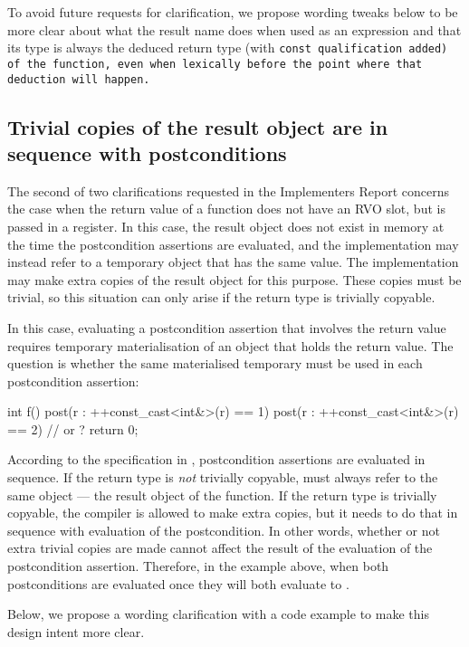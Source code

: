 To avoid future requests for clarification, we propose wording tweaks below to be more clear about what the result name does when used as an expression and that its type is always the deduced return type (with \tt{const} qualification added) of the function, even when lexically before the point where that deduction will happen.

\subsection{Trivial copies of the result object are in sequence with postconditions}

The second of two clarifications requested in the Implementers Report \cite{P3460R0} concerns the case when the return value of a function does not have an RVO slot, but is passed in a register. In this case, the result object does not exist in memory at the time the postcondition assertions are evaluated, and the implementation may instead refer to a temporary object that has the same value. The implementation may make extra copies of the result object for this purpose. These copies must be trivial, so this situation can only arise if the return type is trivially copyable.

In this case, evaluating a postcondition assertion that involves the return value requires temporary materialisation of an object that holds the return value. The question is whether the same materialised temporary must be used in each postcondition assertion:
\begin{codeblock}
int f()
post(r : ++const_cast<int&>(r) == 1)
post(r : ++const_cast<int&>(r) == 2) {  //  or ?
  return 0; 
}
\end{codeblock}
According to the specification in \cite{P2900R10}, postcondition assertions are evaluated in sequence. If the return type is \emph{not} trivially copyable,  must always refer to the same object --- the result object of the function. If the return type is trivially copyable, the compiler is allowed to make extra copies, but it needs to do that in sequence with evaluation of the postcondition. In other words, whether or not extra trivial copies are made cannot affect the result of the evaluation of the postcondition assertion. Therefore, in the example above, when both postconditions are evaluated once they will both evaluate to .

Below, we propose a wording clarification with a code example to make this design intent more clear.

